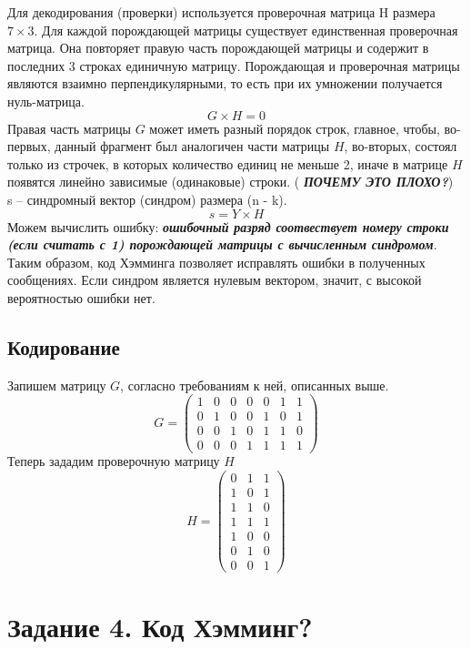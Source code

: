 \documentclass[a5paper, 10pt]{article}
\theoremstyle{definition}
\theoremstyle{plain}
\theoremstyle{remark}
\begin{document}
Для декодирования (проверки) используется проверочная матрица H размера $7 \times 3$. Для каждой порождающей матрицы существует единственная проверочная матрица. Она повторяет правую часть порождающей матрицы и содержит в последних 3 строках единичную матрицу. Порождающая и проверочная матрицы являются взаимно перпендикулярными, то есть при их умножении получается нуль-матрица.
\begin{equation}
G \times H  = 0
\end{equation}
Правая часть матрицы $G$ может иметь разный порядок строк, главное, чтобы, во-первых, данный фрагмент был аналогичен части матрицы $H$, во-вторых, состоял только из строчек, в которых количество единиц не меньше 2, иначе в матрице $H$ появятся линейно зависимые (одинаковые) строки. ( \textbf{\textit{ПОЧЕМУ ЭТО ПЛОХО?}})\\
s -- синдромный вектор (синдром) размера (n - k).
\begin{equation}
s = Y \times H
\end{equation}
Можем вычислить ошибку:  \textbf{\textit{ошибочный разряд соотвествует номеру строки (если считать с 1) порождающей матрицы с вычисленным синдромом}}. Таким образом, код Хэмминга позволяет исправлять ошибки в полученных сообщениях. Если синдром является нулевым вектором, значит, с высокой вероятностью ошибки нет.

\subsection{Кодирование}
Запишем матрицу $G$, согласно требованиям к ней, описанных выше.
\begin{equation}
G = 
\begin{pmatrix}
1 & 0 & 0 & 0 & 0 & 1 & 1\\
0 & 1 & 0 & 0 & 1 & 0 & 1\\
0 & 0 & 1 & 0 & 1 & 1 & 0\\
0 & 0 & 0 & 1 & 1 & 1 & 1
\end{pmatrix}
\end{equation}
Теперь зададим проверочную матрицу $H$
\begin{equation}
H = 
\begin{pmatrix}
 0 & 1 & 1\\
 1 & 0 & 1\\
 1 & 1 & 0\\
 1 & 1 & 1 \\
1 & 0 & 0\\
0 & 1 & 0 \\
0 & 0 & 1
\end{pmatrix}
\end{equation}
\section{Задание 4. Код Хэмминг?}
\end{document}

